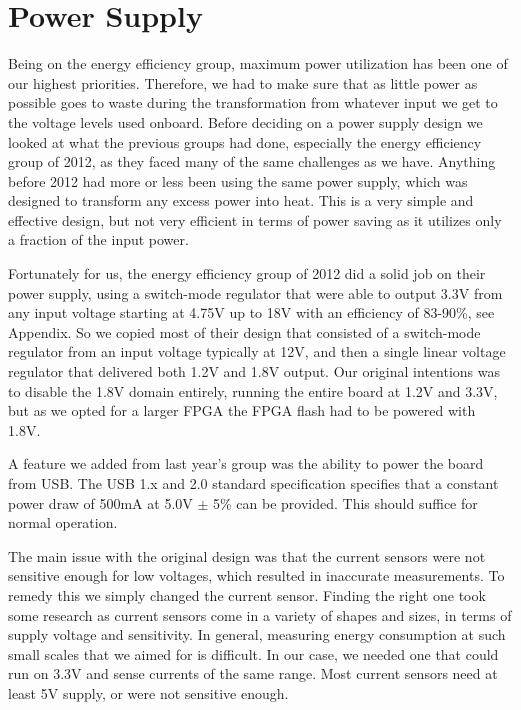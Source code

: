 \section{Power Supply}

Being on the energy efficiency group, maximum power utilization has been one of
our highest priorities. Therefore, we had to make sure that as little power as
possible goes to waste during the transformation from whatever input we get to
the voltage levels used onboard. Before deciding on a power supply design we
looked at what the previous groups had done, especially the energy efficiency
group of 2012, as they faced many of the same challenges as we have. Anything
before 2012 had more or less been using the same power supply, which was
designed to transform any excess power into heat. This is a very simple and
effective design, but not very efficient in terms of power saving as it utilizes
only a fraction of the input power.

Fortunately for us, the energy efficiency group of 2012 did a solid job on their
power supply, using a switch-mode regulator that were able to output 3.3V from
any input voltage starting at 4.75V up to 18V with an efficiency of 83-90\%, see
Appendix. So we copied most of their design
that consisted of a switch-mode regulator from an input voltage typically at
12V, and then a single linear voltage regulator that delivered both 1.2V and
1.8V output. Our original intentions was to disable the 1.8V domain entirely,
running the entire board at 1.2V and 3.3V, but as we opted for a larger FPGA the
FPGA flash had to be powered with 1.8V.

A feature we added from last year's group was the ability to power the board
from USB. The USB 1.x and 2.0 standard specification specifies that a constant
power draw of 500mA at 5.0V $\pm$ 5\% can be provided.  This should suffice for normal operation.

The main issue with the original design was that the current sensors were not
sensitive enough for low voltages, which resulted in inaccurate measurements. To
remedy this we simply changed the current sensor. Finding the right one took
some research as current sensors come in a variety of shapes and sizes, in terms
of supply voltage and sensitivity. In general, measuring energy consumption at
such small scales that we aimed for is difficult. In our case, we needed one
that could run on 3.3V and sense currents of the same range. Most current
sensors need at least 5V supply, or were not sensitive
enough.

